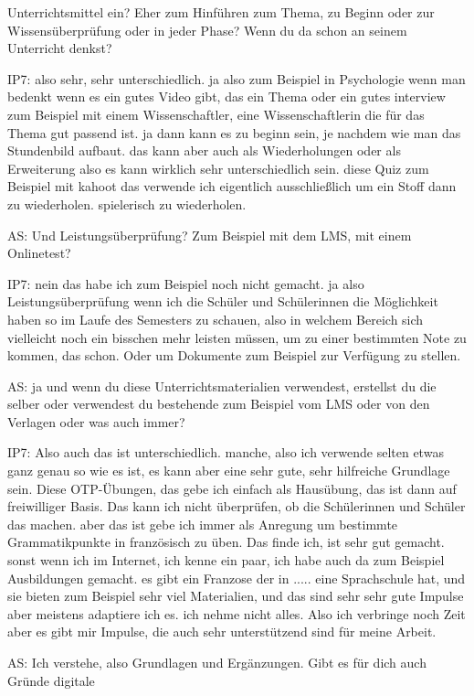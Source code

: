 \documentclass[fontsize=11pt,paper=a4]{scrbook}
\begin{document}
{\begin{itemize*}
Unterrichtsmittel ein? Eher zum Hinführen zum Thema, zu Beginn oder zur
Wissensüberprüfung oder in jeder Phase?
Wenn du da schon an seinem
Unterricht denkst?
\item[IP7:] also sehr, sehr 
unterschiedlich. ja also zum Beispiel in
Psychologie wenn man bedenkt wenn es ein
gutes Video gibt, das ein Thema oder
ein gutes interview zum Beispiel mit
einem Wissenschaftler, eine
Wissenschaftlerin die für das Thema gut
passend ist. ja dann kann es zu beginn sein, je nachdem wie man das Stundenbild aufbaut. das kann aber auch als
Wiederholungen oder als Erweiterung also
es kann wirklich sehr unterschiedlich sein.
diese Quiz zum Beispiel mit kahoot das verwende ich eigentlich ausschließlich um
ein Stoff dann zu wiederholen.
spielerisch zu wiederholen.
\item[AS:] Und Leistungsüberprüfung? Zum Beispiel mit dem LMS, mit einem Onlinetest?
\item[IP7:] nein das habe ich zum Beispiel noch
nicht gemacht. ja also
Leistungsüberprüfung wenn ich die
Schüler und Schülerinnen die Möglichkeit
haben so im Laufe des Semesters
zu schauen, also in welchem Bereich
sich vielleicht noch ein bisschen mehr
leisten müssen, um zu einer bestimmten Note zu
kommen,
das schon.
Oder um  Dokumente zum Beispiel
zur Verfügung zu stellen.
\item[AS:] ja und wenn du diese
Unterrichtsmaterialien verwendest, 
erstellst du die selber oder verwendest
du bestehende zum Beispiel vom LMS oder von den Verlagen oder was auch
immer?
\item[IP7:] Also auch das ist unterschiedlich.
manche, also ich verwende selten etwas
ganz genau so wie es ist, es kann aber eine
sehr gute, sehr hilfreiche Grundlage sein. Diese OTP-Übungen, das gebe ich einfach als Hausübung, das ist dann auf freiwilliger Basis. Das  kann ich nicht überprüfen, ob die Schülerinnen und Schüler das machen. 
aber das ist gebe ich immer als Anregung um bestimmte Grammatikpunkte in französisch zu üben.
Das finde ich, ist sehr gut gemacht. sonst
wenn ich im Internet, ich kenne ein paar,
ich habe auch da zum Beispiel
Ausbildungen gemacht. es gibt ein
Franzose der in ..... eine Sprachschule
hat, und sie bieten zum Beispiel sehr viel Materialien, und das sind sehr
sehr gute Impulse aber meistens
adaptiere ich es. ich nehme nicht alles. Also ich verbringe noch Zeit aber
es gibt mir Impulse, die auch sehr unterstützend sind für meine Arbeit.
\item[AS:] Ich verstehe, also Grundlagen und Ergänzungen. Gibt es für dich auch Gründe digitale

\end{itemize*}}
\end{document}
